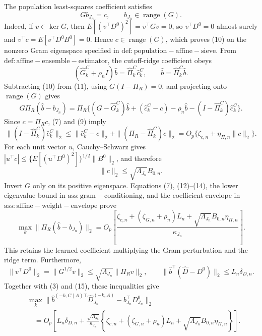 The population least-squares coefficient satisfies
\[
 Gb_{J_n}=c,\qquad b_{J_n}\in\operatorname{range}(G).                     \tag{10}
\]
Indeed, if \(v\in\ker G\), then \(E[(v^\top D^0)^2]=v^\top Gv=0\), so \(v^\top D^0=0\) almost surely and \(v^\top c=E[v^\top D^0B^0]=0\).  Hence \(c\in\operatorname{range}(G)\), which proves (10) on the nonzero Gram eigenspace specified in \(\mathrm{def:population-affine-sieve}\).  From \(\mathrm{def:affine-ensemble-estimator}\), the cutoff-ridge coefficient obeys
\[
 (\widehat G_k^C+\rho_n I)\widehat b=\widehat\Pi_k^C\widehat c_k^C,
 \qquad \widehat b=\widehat\Pi_k^C\widehat b.                            \tag{11}
\]
Subtracting (10) from (11), using \(G(I-\Pi_R)=0\), and projecting onto \(\operatorname{range}(G)\) gives
\[
 G\Pi_R(\widehat b-b_{J_n})
 =\Pi_R\{(G-\widehat G_k^C)\widehat b+(\widehat c_k^C-c)
 -\rho_n\widehat b-(I-\widehat\Pi_k^C)\widehat c_k^C\}.                 \tag{12}
\]
Since \(c=\Pi_Rc\), (7) and (9) imply
\[
 \|(I-\widehat\Pi_k^C)\widehat c_k^C\|_2
 \le \|\widehat c_k^C-c\|_2+\|(\Pi_R-\widehat\Pi_k^C)c\|_2
 =O_p\{\zeta_{c,n}+\eta_{\Pi,n}\|c\|_2\}.                             \tag{13}
\]
For each unit vector \(u\), Cauchy--Schwarz gives
\(
 |u^\top c|\le\{E[(u^\top D^0)^2]\}^{1/2}\|B^0\|_2
\), and therefore
\[
 \|c\|_2\le\sqrt{\Lambda_{J_n}}B_{0,n}.                                \tag{14}
\]
Invert \(G\) only on its positive eigenspace.  Equations (7), (12)--(14), the lower eigenvalue bound in \(\mathrm{ass:gram-conditioning}\), and the coefficient envelope in \(\mathrm{ass:affine-weight-envelope}\) prove
\[
 \max_k\|\Pi_R(\widehat b-b_{J_n})\|_2
 =O_p\!\left[
 \frac{\zeta_{c,n}+(\zeta_{G,n}+\rho_n)L_n
 +\sqrt{\Lambda_{J_n}}B_{0,n}\eta_{\Pi,n}}
 {\kappa_{J_n}}
 \right].                                                                  \tag{15}
\]
This retains the learned coefficient multiplying the Gram perturbation and the ridge term.  Furthermore,
\[
 \|v^\top D^0\|_2=\|G^{1/2}v\|_2
 \le\sqrt{\Lambda_{J_n}}\|\Pi_Rv\|_2,
 \qquad
 \|\widehat b^\top(\widehat D-D^0)\|_2\le L_n\delta_{D,n}.
\]
Together with (3) and (15), these inequalities give
\[
\begin{aligned}
 &\max_k\|\widehat b^{(-k,C\mid A)\top}\widehat D_{J_n}^{(-k,A)}
       -b_{J_n}^\top D^0_{J_n}\|_2\\
 &\quad=O_p\!\left[L_n\delta_{D,n}
 +\frac{\sqrt{\Lambda_{J_n}}}{\kappa_{J_n}}
 \left\{\zeta_{c,n}+(\zeta_{G,n}+\rho_n)L_n
 +\sqrt{\Lambda_{J_n}}B_{0,n}\eta_{\Pi,n}\right\}\right].             \tag{16}
\end{aligned}
\]


